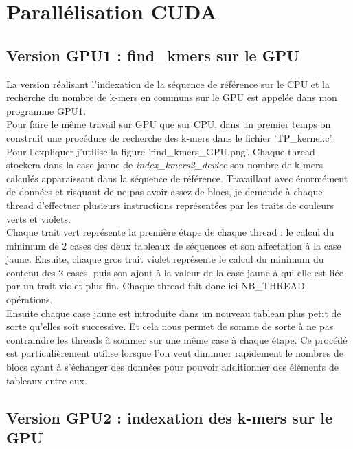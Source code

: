 \documentclass[10pt]{article}
\begin{document}
\section{Parallélisation CUDA}


 \subsection{Version GPU1 : find\_kmers sur le GPU}


La version réalisant l'indexation de la séquence de référence sur le CPU et la recherche du nombre de k-mers en communs sur le GPU est appelée dans mon programme GPU1. \\


Pour faire le même travail sur GPU que sur CPU, dans un premier temps on construit une procédure de recherche des k-mers dans le fichier 'TP\_kernel.c'. \\


Pour l'expliquer j'utilise la figure 'find\_kmers\_GPU.png'. Chaque thread stockera dans la case jaune de \textit{index\_kmers2\_device} son nombre de k-mers calculés apparaissant dans la séquence de référence. Travaillant avec énormément de données et risquant de ne pas avoir assez de blocs, je demande à chaque thread d'effectuer plusieurs instructions représentées par les traits de couleurs verts et violets. \\


Chaque trait vert représente la première étape de chaque thread : le calcul du minimum de 2 cases des deux tableaux de séquences et son affectation à la case jaune. Ensuite, chaque gros trait violet représente le calcul du minimum du contenu des 2 cases, puis son ajout à la valeur de la case jaune à qui elle est liée par un trait violet plus fin. Chaque thread fait donc ici NB\_THREAD opérations. \\
 

Ensuite chaque case jaune est introduite dans un nouveau tableau plus petit de sorte qu'elles soit successive. Et cela nous permet de somme de sorte à ne pas contraindre les threads à sommer sur une même case à chaque étape. Ce procédé est particulièrement utilise lorsque l'on veut diminuer rapidement le nombres de blocs ayant à s'échanger des données pour pouvoir additionner des éléments de tableaux entre eux. \\


\subsection{Version GPU2 : indexation des k-mers sur le GPU}
\end{document}
